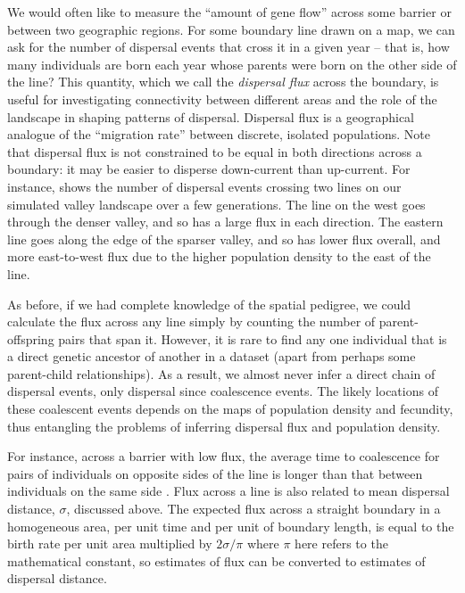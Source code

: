\documentclass{ar-1col}
\newcommand{\g}[1]{{\color{blue}{#1}}}
\renewcommand{\emph}[1]{{\textit{#1}}}
\begin{document}
We would often like to measure the ``amount of gene flow'' across some barrier
or between two geographic regions.
For some boundary line drawn on a map,
we can ask for the number of dispersal events that cross it in a given year -- 
that is, 
how many individuals are born each year whose parents
were born on the other side of the line?
This quantity, which we call the \emph{dispersal flux} across the boundary,
is useful for investigating connectivity between different areas
and the role of the landscape in shaping patterns of dispersal.
Dispersal flux is a geographical analogue of
the ``migration rate'' between discrete, isolated populations. 
Note that dispersal flux is not constrained to be equal in both directions across a boundary:
it may be easier to disperse down-current than up-current.
For instance, \g{Figure~\ref{fig:dispersal}C}
shows the number of dispersal events crossing two lines on our simulated valley landscape
over a few generations.
The line on the west goes through the denser valley, 
and so has a large flux in each direction.
The eastern line goes along the edge of the sparser valley,
and so has lower flux overall, and more east-to-west flux
due to the higher population density to the east of the line.

As before, if we had complete knowledge of the spatial pedigree,
we could calculate the flux across any line simply by counting the number of
parent-offspring pairs that span it.
However, it is rare to find any one individual
that is a direct genetic ancestor of another in a dataset
(apart from perhaps some parent-child relationships).
As a result, we almost never infer a direct chain of dispersal events,
only dispersal since coalescence events.
The likely locations of these coalescent events
depends on the maps of population density and fecundity,
thus entangling
the problems of inferring dispersal flux and population density.

For instance, across a barrier with low flux,
the average time to coalescence for pairs of individuals on opposite sides of the line
is longer than that between individuals on the same side \citep{bedassle,Duforet-Frebourg_Blum_2014,ringbauer2018estimating}.
Flux across a line is also related to mean dispersal distance, $\sigma$, discussed above.
The expected flux across a straight boundary in a homogeneous area,
per unit time and per unit of boundary length,
is equal to the birth rate per unit area multiplied by $2 \sigma / \pi$
\citep{buffon1777}
where $\pi$ here refers to the mathematical constant,
so estimates of flux can be converted to estimates of dispersal distance.
\end{document}
